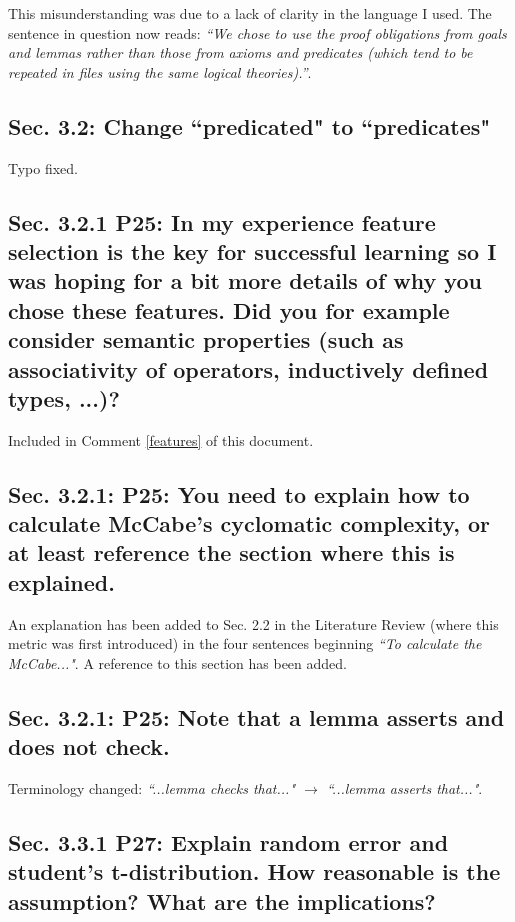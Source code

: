 \documentclass[]{article}
\begin{document}
This misunderstanding was due to a lack of clarity in the language I used. The sentence in question now reads: \emph{``We chose to use the proof obligations from goals and lemmas rather than those from axioms and predicates (which tend to be repeated in files using the same logical theories).''}.

\subsection{Sec. 3.2: Change ``predicated" to ``predicates"}

Typo fixed.

\subsection{Sec. 3.2.1 P25: In my experience feature selection is the key for successful learning so I was hoping for a bit more details of why you chose these features. Did you for example consider semantic properties (such as associativity of operators, inductively defined types, ...)?}

Included in Comment \ref{features} of this document. 

\subsection{Sec. 3.2.1: P25: You need to explain how to calculate McCabe's cyclomatic complexity, or at least reference the section where this is explained.}

An explanation has been added to Sec. 2.2 in the Literature Review (where this metric was first introduced) in the four sentences beginning \emph{``To calculate the McCabe..."}. A reference to this section has been added.

\subsection{Sec. 3.2.1: P25: Note that a lemma asserts and does not check.}

Terminology changed: \emph{``...lemma checks that..." $\rightarrow$ ``...lemma asserts that..."}.

\subsection{Sec. 3.3.1 P27: Explain random error and student's t-distribution. How reasonable is the assumption? What are the implications?}
\end{document}
